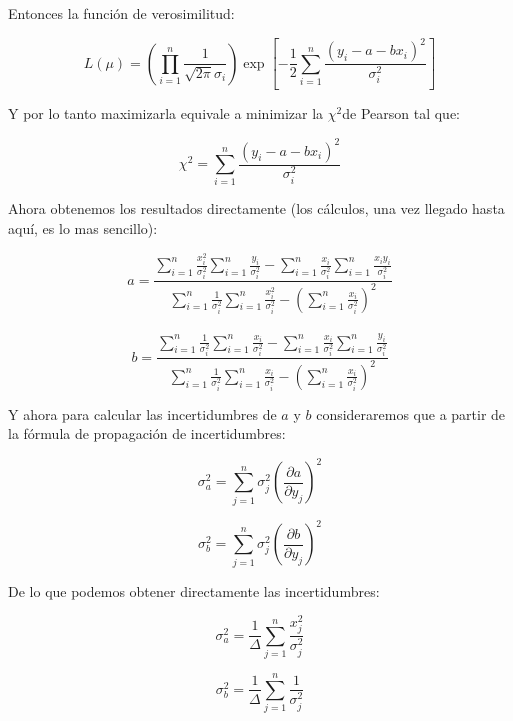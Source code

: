 \documentclass[12pt,a4paper]{book}
\newcommand{\parentesis}[1]{\left( #1 \right)}
\newcommand{\parciales}[2]{\frac{\partial #1}{\partial #2}}
\newcommand{\peso}[1]{\sum_{i=1}^n \frac{#1}{\sigma_i^2}}
\newcommand{\chii}{$\chi^2$}
\begin{document}
Entonces la función de verosimilitud:

\begin{equation}
L (\mu) =\parentesis{\prod_{i=1}^n \dfrac{1}{\sqrt{2 \pi} \sigma_i}}\exp \left[ -\dfrac{1}{2} \sum_{i=1}^n \dfrac{(y_i - a - b x_i)^2}{\sigma_i^2} \right]
\end{equation}

Y por lo tanto maximizarla equivale a minimizar la \chii de Pearson tal que:

\begin{equation}
\chi^2= \sum_{i=1}^n \dfrac{(y_i -a - bx_i)^2}{\sigma_i^2}
\end{equation}

Ahora obtenemos los resultados  directamente (los cálculos, una vez llegado hasta aquí, es lo mas sencillo):

\begin{equation}
a = \dfrac{\peso{x_i^2} \peso{y_i} - \peso{x_i} \peso{x_i y_i}}{\peso{1} \peso{x_i^2} - \parentesis{\peso{x_i}}^2}
\end{equation} \\

\begin{equation}
b = \dfrac{\peso{1} \peso{x_i} - \peso{x_i} \peso{y_i}}{\peso{1} \peso{x_i} - \parentesis{\peso{x_i}}^2}
\end{equation}

Y ahora para calcular las incertidumbres de $a$ y $b$ consideraremos que a partir de la fórmula de propagación de incertidumbres: 

\begin{equation}
\sigma_a^2  = \sum_{j=1}^n \sigma_j^2 \parentesis{\parciales{a}{y_j}}^2
\end{equation}

\begin{equation}
\sigma_b^2  = \sum_{j=1}^n \sigma_j^2 \parentesis{\parciales{b}{y_j}}^2
\end{equation}

De lo que podemos obtener directamente las incertidumbres:

\begin{equation}
\sigma_a^2 = \dfrac{1}{\Delta} \sum_{j=1}^n \dfrac{x_j^2}{\sigma_j^2}
\end{equation}

\begin{equation}
\sigma_b^2 = \dfrac{1}{\Delta} \sum_{j=1}^n \dfrac{1}{\sigma_j^2}
\end{equation}
\end{document}
